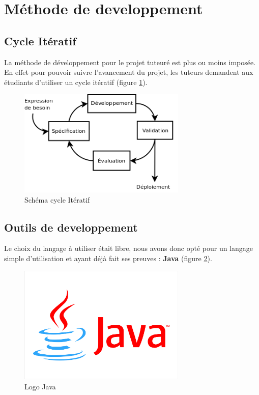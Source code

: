 \section{Méthode de developpement}


\subsection{Cycle Itératif}
La méthode de développement pour le projet tuteuré est plus ou moins imposée. En effet pour pouvoir suivre l'avancement du projet, les tuteurs demandent aux étudiants d'utiliser un cycle itératif (figure \ref{cycle_iteratif}).

\begin{figure}[H]
\centering
\includegraphics[width=8cm]{images/activite/cycle_iteratif.png}
\caption{Schéma cycle Itératif}
\label{cycle_iteratif}
\end{figure}

\subsection{Outils de developpement}
Le choix du langage à utiliser était libre, nous avons donc opté pour un langage simple d'utilisation et ayant déjà fait ses preuves : \textbf{Java} (figure \ref{java_logo}).

\begin{figure}[!h]
\centering
\includegraphics[width=8cm]{images/activite/javaLogo.png}
\caption{Logo Java}
\label{java_logo}
\end{figure}

